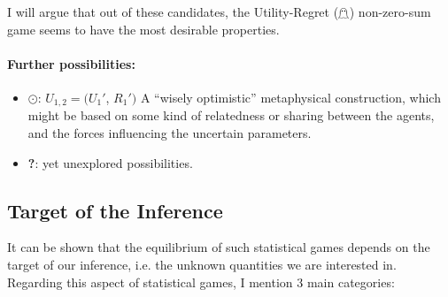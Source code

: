\documentclass{article}
\theoremstyle{definition}
\begin{document}
I will argue that out of these candidates, the Utility-Regret ($\mathghost$) non-zero-sum game seems to have the most desirable properties.

\paragraph{Further possibilities:}

\begin{itemize}
    \item $\odot$: $U_{1,2} = (U_1'$, $R_1')$ A ``wisely optimistic'' \cite{book:OptimismPessimismPsychology} metaphysical construction, which might be based on some kind of relatedness or sharing between the agents, and the forces influencing the uncertain parameters. 
    \item {\bf ?}: yet unexplored possibilities. 
\end{itemize}

\subsection{Target of the Inference}

It can be shown that the equilibrium of such statistical games depends on the target of our inference, i.e. the unknown quantities we are interested in.
Regarding this aspect of statistical games, I mention 3 main categories:
\end{document}
